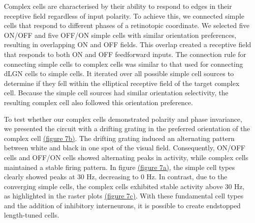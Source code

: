 \documentclass[12pt]{article}
\begin{document}
Complex cells are characterised by their ability to respond to edges in their receptive field regardless of input polarity. To achieve this, we connected simple cells that respond to different phases of a retinotopic coordinate. We selected five ON/OFF and five OFF/ON simple cells with similar orientation preferences, resulting in overlapping ON and OFF fields. This overlap created a receptive field that responds to both ON and OFF feedforward inputs. The connection rule for connecting simple cells to complex cells was similar to that used for connecting dLGN cells to simple cells. It iterated over all possible simple cell sources to determine if they fell within the elliptical receptive field of the target complex cell. Because the simple cell sources had similar orientation selectivity, the resulting complex cell also followed this orientation preference.

To test whether our complex cells demonstrated polarity and phase invariance, we presented the circuit with a drifting grating in the preferred orientation of the complex cell \hyperref[fig:polarity invariance]{(figure 7b)}. The drifting grating induced an alternating pattern between white and black in one spot of the visual field. Consequently, ON/OFF cells and OFF/ON cells showed alternating peaks in activity, while complex cells maintained a stable firing pattern. In figure \hyperref[fig:polarity invariance]{(figure 7a)}, the simple cell types clearly showed peaks at 30 Hz, decreasing to 0 Hz. In contrast, due to the converging simple cells, the complex cells exhibited stable activity above 30 Hz, as highlighted in the raster plots \hyperref[fig:polarity invariance]{(figure 7c)}. With these fundamental cell types and the addition of inhibitory interneurons, it is possible to create endstopped length-tuned cells.



\end{document}
